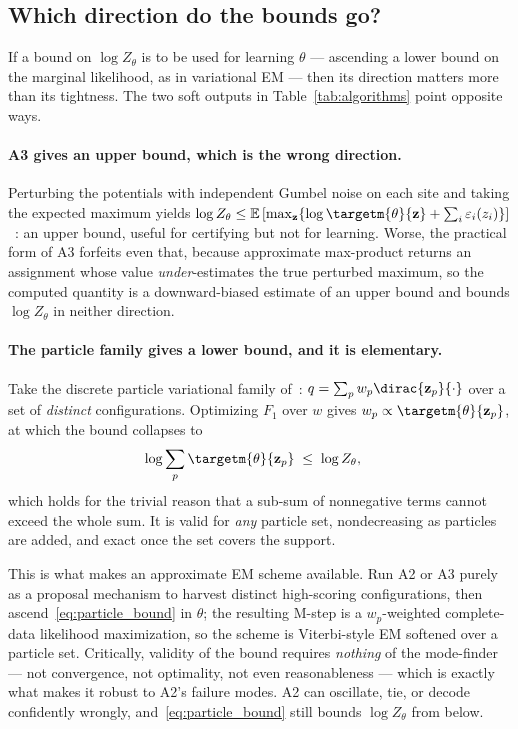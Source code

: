 \subsection{Which direction do the bounds go?}
\label{sec:bound_directions}

If a bound on $\log Z_\theta$ is to be used for learning $\theta$ --- ascending a lower bound on the marginal likelihood, as in variational EM --- then its direction matters more than its tightness. The two soft outputs in Table~\ref{tab:algorithms} point opposite ways.

\paragraph{A3 gives an upper bound, which is the wrong direction.} Perturbing the potentials with independent Gumbel noise on each site and taking the expected maximum yields $\log Z_\theta \leq \mathbb{E}\left[\max_{\mathbf{z}}\{\log \targetm{\theta}{\mathbf{z}} + \sum_i \varepsilon_i(z_i)\}\right]$~\citep{Hazan2012}: an upper bound, useful for certifying but not for learning. Worse, the practical form of A3 forfeits even that, because approximate max-product returns an assignment whose value \emph{under}-estimates the true perturbed maximum, so the computed quantity is a downward-biased estimate of an upper bound and bounds $\log Z_\theta$ in neither direction.

\paragraph{The particle family gives a lower bound, and it is elementary.} Take the discrete particle variational family of~\citet{Saeedi2017}: $q = \sum_p w_p \dirac{\mathbf{z}_p}{\cdot}$ over a set of \emph{distinct} configurations. Optimizing $F_1$ over $w$ gives $w_p \propto \targetm{\theta}{\mathbf{z}_p}$, at which the bound collapses to
\begin{align}
    \label{eq:particle_bound}
    \log \sum_p \targetm{\theta}{\mathbf{z}_p} &\;\leq\; \log Z_\theta,
\end{align}
which holds for the trivial reason that a sub-sum of nonnegative terms cannot exceed the whole sum. It is valid for \emph{any} particle set, nondecreasing as particles are added, and exact once the set covers the support.

This is what makes an approximate EM scheme available. Run A2 or A3 purely as a proposal mechanism to harvest distinct high-scoring configurations, then ascend~\eqref{eq:particle_bound} in $\theta$; the resulting M-step is a $w_p$-weighted complete-data likelihood maximization, so the scheme is Viterbi-style EM softened over a particle set. Critically, validity of the bound requires \emph{nothing} of the mode-finder --- not convergence, not optimality, not even reasonableness --- which is exactly what makes it robust to A2's failure modes. A2 can oscillate, tie, or decode confidently wrongly, and~\eqref{eq:particle_bound} still bounds $\log Z_\theta$ from below.

